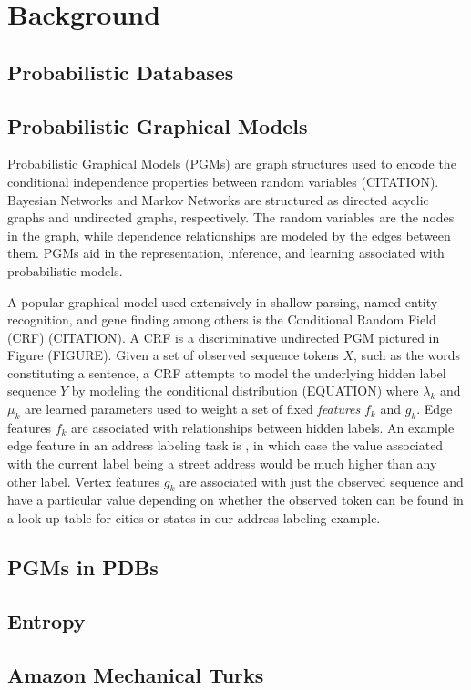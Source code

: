 \section{Background}
\subsection{Probabilistic Databases}
\subsection{Probabilistic Graphical Models}
Probabilistic Graphical Models (PGMs) are graph structures used to encode the conditional independence properties between random variables (CITATION).  Bayesian Networks and Markov Networks are structured as directed acyclic graphs and undirected graphs, respectively.  The random variables are the nodes in the graph, while dependence relationships are modeled by the edges between them.  PGMs aid in the representation, inference, and learning associated with probabilistic models.

A popular graphical model used extensively in shallow parsing, named entity recognition, and gene finding among others is the Conditional Random Field (CRF) (CITATION).  A CRF is a discriminative undirected PGM pictured in Figure (FIGURE).  Given a set of observed sequence tokens $X$, such as the words constituting a sentence, a CRF attempts to model the underlying hidden label sequence $Y$ by modeling the conditional distribution
(EQUATION)
where $\lambda_{k}$ and $\mu_{k}$ are learned parameters used to weight a set of fixed \textit{features} $f_{k}$ and $g_{k}$. Edge features $f_{k}$ are associated with relationships between hidden labels.  An example edge feature in an address labeling task is , in which case the value associated with the current label being a street address would be much higher than any other label. Vertex features $g_{k}$ are associated with just the observed sequence and have a particular value depending on whether the observed token can be found in a look-up table for cities or states in our address labeling example.
\subsection{PGMs in PDBs}
\subsection{Entropy}
\subsection{Amazon Mechanical Turks}
